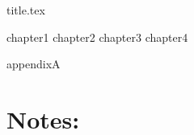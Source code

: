\documentclass[a4paper,11pt]{book}
\begin{document}
\frontmatter
{title.tex}

\clearpage
\thispagestyle{empty}

\tableofcontents
\listoffigures

\mainmatter

{chapter1}
{chapter2}
{chapter3}
{chapter4}

\backmatter
{appendixA}

\chapter*{Notes:}
\end{document}
